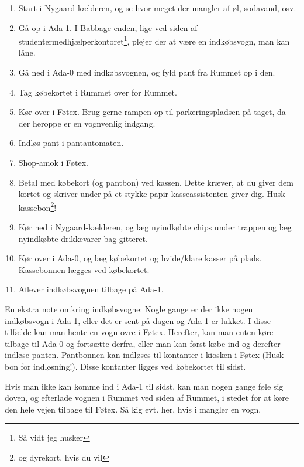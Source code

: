 \begin{enumerate}
\item Start i Nygaard-kælderen, og se hvor meget der mangler af øl,
  sodavand, osv.
\item Gå op i Ada-1. I Babbage-enden, lige ved siden af
  studentermedhjælperkontoret\footnote{Så vidt jeg husker}, plejer der
  at være en indkøbsvogn, man kan låne.
\item Gå ned i Ada-0 med indkøbsvognen, og fyld pant fra Rummet op i
  den.
\item Tag købekortet i Rummet over for Rummet.
\item Kør over i Føtex. Brug gerne rampen op til parkeringspladsen på
  taget, da der heroppe er en vognvenlig indgang.
\item Indløs pant i pantautomaten.
\item Shop-amok i Føtex.
\item Betal med købekort (og pantbon) ved kassen. Dette kræver, at du
  giver dem kortet og skriver under på et stykke papir
  kasseassistenten giver dig. Husk kassebon\footnote{og dyrekort, hvis
    du vil}!
\item Kør ned i Nygaard-kælderen, og læg nyindkøbte chips under
  trappen og læg nyindkøbte drikkevarer bag gitteret.
\item Kør over i Ada-0, og læg købekortet og hvide/klare kasser på
  plads. Kassebonnen lægges ved købekortet.
\item Aflever indkøbsvognen tilbage på Ada-1.
\end{enumerate}

En ekstra note omkring indkøbsvogne: Nogle gange er der ikke nogen
indkøbsvogn i Ada-1, eller det er sent på dagen og Ada-1 er lukket. I
disse tilfælde kan man hente en vogn ovre i Føtex. Herefter, kan man
enten køre tilbage til Ada-0 og fortsætte derfra, eller man kan først
købe ind og derefter indløse panten. Pantbonnen kan indløses til
kontanter i kiosken i Føtex (Husk bon for indløsning!). Disse
kontanter ligges ved købekortet til sidst.

Hvis man ikke kan komme ind i Ada-1 til sidst, kan man nogen gange
føle sig doven, og efterlade vognen i Rummet ved siden af Rummet, i
stedet for at køre den hele vejen tilbage til Føtex. Så kig evt. her,
hvis i mangler en vogn.




